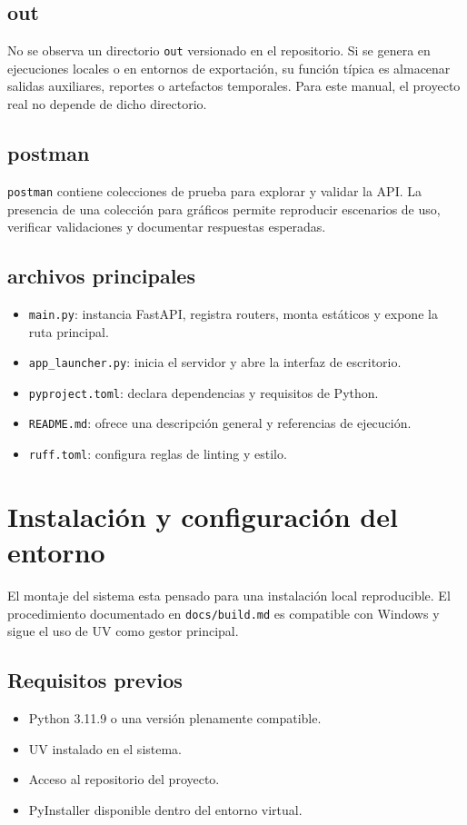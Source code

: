 \documentclass[12pt,onecolumn]{IEEEtran}
\begin{document}
\subsection{out}
No se observa un directorio \texttt{out} versionado en el repositorio. Si se genera en ejecuciones locales o en entornos de exportación, su función típica es almacenar salidas auxiliares, reportes o artefactos temporales. Para este manual, el proyecto real no depende de dicho directorio.

\subsection{postman}
\texttt{postman} contiene colecciones de prueba para explorar y validar la API. La presencia de una colección para gráficos permite reproducir escenarios de uso, verificar validaciones y documentar respuestas esperadas.

\subsection{archivos principales}
\begin{itemize}
  \item \texttt{main.py}: instancia FastAPI, registra routers, monta estáticos y expone la ruta principal.
  \item \texttt{app\_launcher.py}: inicia el servidor y abre la interfaz de escritorio.
  \item \texttt{pyproject.toml}: declara dependencias y requisitos de Python.
  \item \texttt{README.md}: ofrece una descripción general y referencias de ejecución.
  \item \texttt{ruff.toml}: configura reglas de linting y estilo.
\end{itemize}

\section{Instalación y configuración del entorno}
El montaje del sistema esta pensado para una instalación local reproducible. El procedimiento documentado en \texttt{docs/build.md} es compatible con Windows y sigue el uso de UV como gestor principal.

\subsection{Requisitos previos}
\begin{itemize}
  \item Python 3.11.9 o una versión plenamente compatible.
  \item UV instalado en el sistema.
  \item Acceso al repositorio del proyecto.
  \item PyInstaller disponible dentro del entorno virtual.
\end{itemize}
\end{document}
